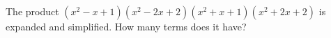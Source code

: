 The product $(x^2-x+1)(x^2-2x+2)(x^2+x+1)(x^2+2x+2)$ is expanded and simplified. How many terms does it have?
